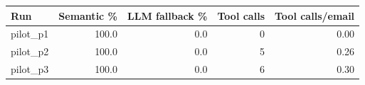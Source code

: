 \begin{tabular}{lrrrr}
\toprule
Run & Semantic \% & LLM fallback \% & Tool calls & Tool calls/email \\
\midrule
pilot\_p1 & 100.0 & 0.0 & 0 & 0.00 \\
pilot\_p2 & 100.0 & 0.0 & 5 & 0.26 \\
pilot\_p3 & 100.0 & 0.0 & 6 & 0.30 \\
\bottomrule
\end{tabular}
